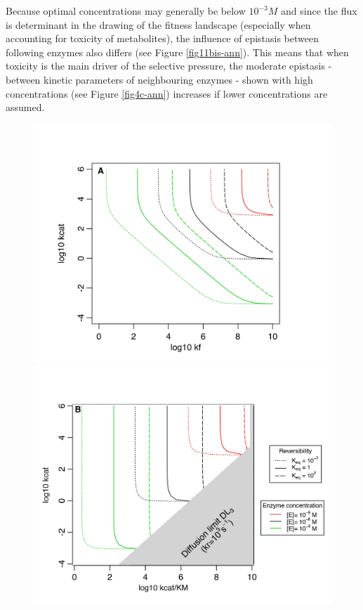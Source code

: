 Because optimal concentrations may generally be below $10^{-3}M$ and since the flux is determinant in the drawing of the fitness landscape (especially when accounting for toxicity of metabolites), the influence of epistasis between following enzymes also differs (see Figure \ref{fig11bis-ann}). This means that when toxicity is the main driver of the selective pressure, the moderate epistasis - between kinetic parameters of neighbouring enzymes - shown with high concentrations (see Figure \ref{fig4c-ann}) increases if lower concentrations are assumed.

\begin{figure}[h!]
\vspace{-0.75cm}
\centering
\begin{minipage}[c]{0.49\linewidth}
\hspace{-0.5cm}
\includegraphics[scale=0.52,trim=0cm 0cm 0cm 1cm,clip]{pics/SM-Enzymes/Fit_Econc_sens2Enz.jpeg} 
\end{minipage} \hspace{-1cm}
\begin{minipage}[c]{0.49\linewidth}
\includegraphics[scale=0.52,trim=0cm 0cm 0cm 1cm,clip]{pics/SM-Enzymes/Fit_Econc_sens2Enz_kactKM.jpeg}

\end{minipage}
\end{figure}
